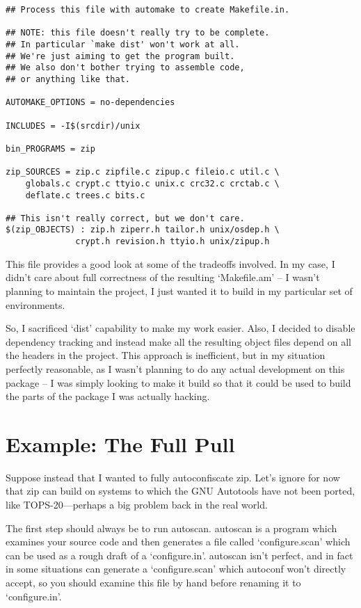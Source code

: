 \begin{Verbatim}[frame=single]
## Process this file with automake to create Makefile.in.

## NOTE: this file doesn't really try to be complete.
## In particular `make dist' won't work at all.
## We're just aiming to get the program built.
## We also don't bother trying to assemble code,
## or anything like that.

AUTOMAKE_OPTIONS = no-dependencies

INCLUDES = -I$(srcdir)/unix

bin_PROGRAMS = zip

zip_SOURCES = zip.c zipfile.c zipup.c fileio.c util.c \
    globals.c crypt.c ttyio.c unix.c crc32.c crctab.c \
    deflate.c trees.c bits.c

## This isn't really correct, but we don't care.
$(zip_OBJECTS) : zip.h ziperr.h tailor.h unix/osdep.h \
              crypt.h revision.h ttyio.h unix/zipup.h
\end{Verbatim}

This file provides a good look at some of the tradeoffs involved. In my case, I didn't care about full correctness of the resulting `Makefile.am' -- I wasn't planning to maintain the project, I just wanted it to build in my particular set of environments.

So, I sacrificed `dist' capability to make my work easier. Also, I decided to disable dependency tracking and instead make all the resulting object files depend on all the headers in the project. This approach is inefficient, but in my situation perfectly reasonable, as I wasn't planning to do any actual development on this package -- I was simply looking to make it build so that it could be used to build the parts of the package I was actually hacking. 

\section{Example: The Full Pull}

Suppose instead that I wanted to fully autoconfiscate zip. Let's ignore for 
now that zip can build on systems to which the GNU Autotools have not been 
ported, like TOPS-20---perhaps a big problem back in the real world.

The first step should always be to run autoscan. autoscan is a program which examines your source code and then generates a file called `configure.scan' which can be used as a rough draft of a `configure.in'. autoscan isn't perfect, and in fact in some situations can generate a `configure.scan' which autoconf won't directly accept, so you should examine this file by hand before renaming it to `configure.in'.

